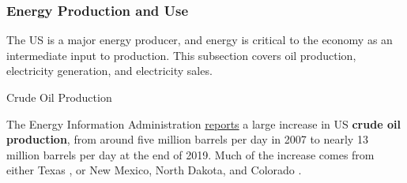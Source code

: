 \subsubsection*{Energy Production and Use}
\begin{minipage}{0.76\textwidth}  
\small The US is a major energy producer, and energy is critical to the economy as an intermediate input to production. This subsection covers oil production, electricity generation, and electricity sales. 
\vspace{0.5mm}

\normalsize Crude Oil Production
\vspace{-0.5mm}

\small The Energy Information Administration \href{https://www.eia.gov/dnav/pet/pet_crd_crpdn_adc_mbblpd_m.htm}{reports} a large increase in US \textbf{crude oil production}, from around five million barrels per day in 2007 to nearly 13 million barrels per day at the end of 2019. Much of the increase comes from either Texas , or New Mexico, North Dakota, and Colorado . 


\vspace{0.5mm}

\vspace{3.6cm}


\end{minipage}
